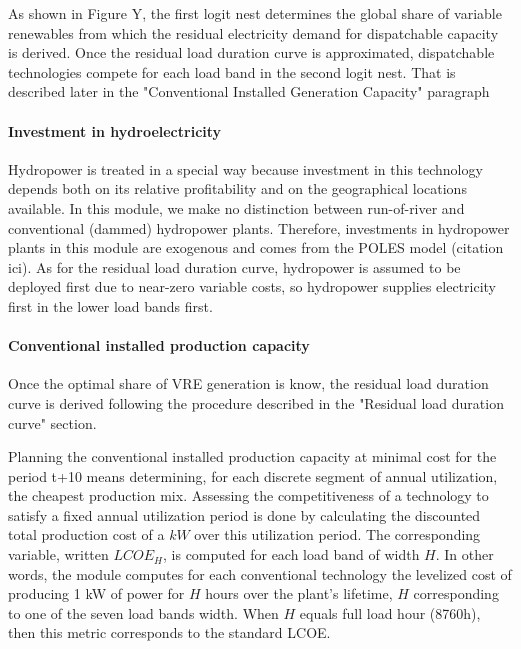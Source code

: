 As shown in Figure Y, the first logit nest determines the global share of variable renewables from which the residual electricity demand for dispatchable capacity is derived. Once the residual load duration curve is approximated, dispatchable technologies compete for each load band in the second logit nest. That is described later in the "Conventional Installed Generation Capacity" paragraph


\paragraph{Investment in hydroelectricity}

Hydropower is treated in a special way because investment in this technology depends both on its relative profitability and on the  geographical locations available.
In this module, we make no distinction between run-of-river and conventional (dammed) hydropower plants. Therefore, investments in hydropower plants in this module are exogenous and comes from the POLES model (citation ici).
As for the residual load duration curve, hydropower is assumed to be deployed first due to near-zero variable costs, so hydropower supplies electricity first in the lower load bands first.


\paragraph{Conventional installed production capacity}

Once the optimal share of VRE generation is know, the residual load duration curve is derived following the procedure described in the "Residual load duration curve" section.



Planning the conventional installed production capacity at minimal cost for the period t+10 means determining, for each discrete segment of annual utilization, the cheapest production mix.
Assessing the competitiveness of a technology to satisfy a fixed annual utilization period is done by calculating the discounted total production cost of a
$kW$ over this utilization period.
The corresponding variable, written $LCOE_{H}$, is computed for each load band of width $H$. In other words, the module computes for each conventional technology the levelized cost of producing 1 kW of power for $H$ hours over the plant's lifetime, $H$ corresponding to one of the seven load bands width. When $H$ equals full load hour (8760h), then this metric corresponds to the standard LCOE.

